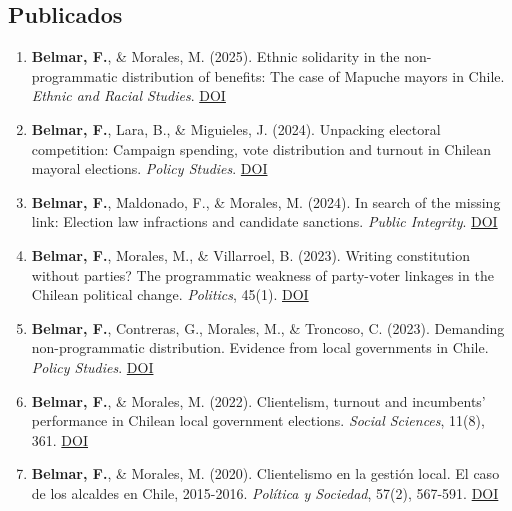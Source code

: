 \documentclass[11pt,a4paper]{article}
\begin{document}
\subsection{Publicados}

\begin{enumerate}[leftmargin=*, label=\arabic*., start=7]
    \item \textbf{Belmar, F.}, \& Morales, M. (2025). Ethnic solidarity in the non-programmatic distribution of benefits: The case of Mapuche mayors in Chile. \textit{Ethnic and Racial Studies}. \href{https://doi.org/10.1080/01419870.2025.2470896}{DOI}

    \item \textbf{Belmar, F.}, Lara, B., \& Miguieles, J. (2024). Unpacking electoral competition: Campaign spending, vote distribution and turnout in Chilean mayoral elections. \textit{Policy Studies}. \href{https://doi.org/10.1080/01442872.2024.2427280}{DOI}

    \item \textbf{Belmar, F.}, Maldonado, F., \& Morales, M. (2024). In search of the missing link: Election law infractions and candidate sanctions. \textit{Public Integrity}. \href{https://doi.org/10.1080/10999922.2024.2364384}{DOI}

    \item \textbf{Belmar, F.}, Morales, M., \& Villarroel, B. (2023). Writing constitution without parties? The programmatic weakness of party-voter linkages in the Chilean political change. \textit{Politics}, 45(1). \href{https://doi.org/10.1177/02633957231158073}{DOI}

    \item \textbf{Belmar, F.}, Contreras, G., Morales, M., \& Troncoso, C. (2023). Demanding non-programmatic distribution. Evidence from local governments in Chile. \textit{Policy Studies}. \href{https://doi.org/10.1080/01442872.2023.2172718}{DOI}

    \item \textbf{Belmar, F.}, \& Morales, M. (2022). Clientelism, turnout and incumbents' performance in Chilean local government elections. \textit{Social Sciences}, 11(8), 361. \href{https://doi.org/10.3390/socsci11080361}{DOI}

    \item \textbf{Belmar, F.}, \& Morales, M. (2020). Clientelismo en la gestión local. El caso de los alcaldes en Chile, 2015-2016. \textit{Política y Sociedad}, 57(2), 567-591. \href{https://doi.org/10.5209/poso.62315}{DOI}
\end{enumerate}
\end{document}
